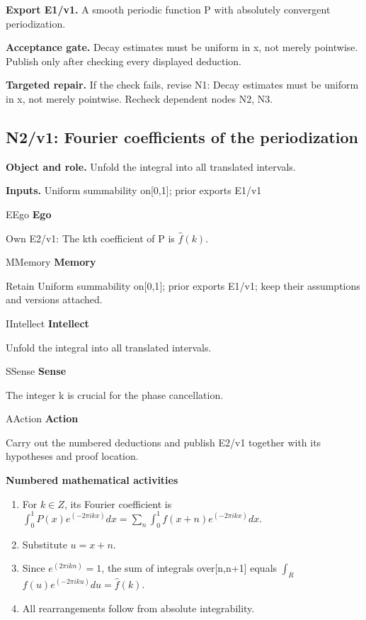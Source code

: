 \documentclass[preprint,12pt,aps,pra,showkeys,amsmath,amssymb,superscriptaddress,floatfix]{revtex4-2}
\theoremstyle{definition}
\theoremstyle{remark}
\newcommand{\mmfaculty}[3]{%
 \begin{mmfacultybox}{#1}{#2}
 {\sffamily\bfseries\color{MMBlue}#2}\par\smallskip #3
 \end{mmfacultybox}}
\newcommand{\field}[2]{\par\smallskip\noindent\textbf{#1.} #2\par}
\begin{document}
\field{Export E1/v1}{A smooth periodic function P with absolutely convergent periodization.}

\field{Acceptance gate}{Decay estimates must be uniform in x, not merely pointwise. Publish only
after checking every displayed deduction.}

\field{Targeted repair}{If the check fails, revise N1: Decay estimates must be uniform in x, not
merely pointwise. Recheck dependent nodes N2, N3.}

\clearpage

\subsection{N2/v1: Fourier coefficients of the periodization}

\field{Object and role}{Unfold the integral into all translated intervals.}

\field{Inputs}{Uniform summability on{[}0,1{]}; prior exports E1/v1}

\mmfaculty{E}{Ego}{Own E2/v1: The kth coefficient of P is \(\widehat f(k)\).}

\mmfaculty{M}{Memory}{Retain Uniform summability on{[}0,1{]}; prior exports E1/v1; keep their
assumptions and versions attached.}

\mmfaculty{I}{Intellect}{Unfold the integral into all translated intervals.}

\mmfaculty{S}{Sense}{The integer k is crucial for the phase cancellation.}

\mmfaculty{A}{Action}{Carry out the numbered deductions and publish E2/v1 together with its
hypotheses and proof location.}

\smallskip\noindent\textbf{Numbered mathematical activities}

\begin{enumerate}[label=N2.\arabic*,leftmargin=3.4em]

\item For \(k\in Z\), its Fourier coefficient is
\(\int _{0}^{1}P(x)e^{(-2\pi ikx)}dx=\sum _n\int _{0}^{1}f(x+n)e^{(-2\pi ikx)}dx\).

\item Substitute \(u=x+n\).

\item Since \(e^{(2\pi ikn)}=1\), the sum of integrals over{[}n,n+1{]} equals
\(\int _R\) \(f(u)e^{(-2\pi iku)}du=\widehat f(k)\).

\item All rearrangements follow from absolute integrability.

\end{enumerate}
\end{document}
